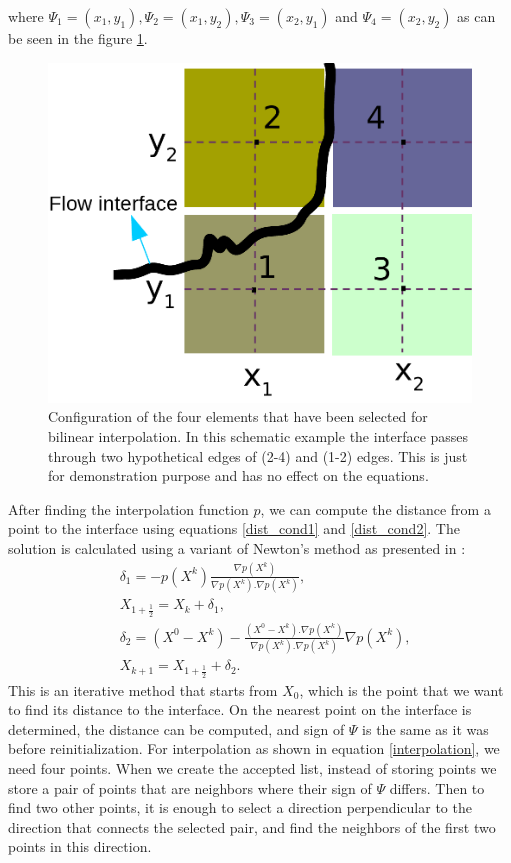 \documentclass[letterpaper,10pt]{article}
\begin{document}
where $\varPsi_1=(x_1,y_1), \varPsi_2=(x_1,y_2), \varPsi_3=(x_2,y_1)$ and $\varPsi_4=(x_2,y_2)$ as can be seen in the figure \ref{fig:bilinear_interp}.
\begin{figure}[ht]
\centering
\includegraphics[scale=.15]{IMAGES/bilinear_interp.png}
\caption{Configuration of the four elements that have been selected for bilinear interpolation. In this schematic example the interface passes through two hypothetical edges of (2-4) and (1-2) edges. This is just for demonstration purpose and has no effect on the equations.}
                \label{fig:bilinear_interp}
\end{figure}
After finding the interpolation function $p$, we can compute the distance from a point to the interface using equations \eqref{dist_cond1} and \eqref{dist_cond2}. 
The solution is calculated using a variant of Newton's method as presented in \cite{Chopp2001}:
\begin{subequations}
\label{eqnewton}
\begin{align}
&\delta_1=-p(X^k)\frac{\nabla p(X^k)}{\nabla p(X^k).\nabla p(X^k)},\\
& X_{1+\frac{1}{2}}=X_k+\delta_1,\\
& \delta_2=(X^0-X^k)-\frac{(X^0-X^k).\nabla p(X^k)}{\nabla p(X^k).\nabla p(X^k)}\nabla p(X^k),\\
&X_{k+1}=X_{1+\frac{1}{2}}+\delta_2.
\end{align}
\end{subequations}
This is an iterative method that starts from $X_0$, which is the point that we want to find its distance to the interface. 
On the nearest point on the interface is determined, the distance can be computed, and sign of $\varPsi$ is the same as it was before reinitialization.
For interpolation as shown in equation \eqref{interpolation}, we need four points. When we create the accepted list, instead of storing points we store a pair of points that are 
neighbors where their sign of $\varPsi$ differs. Then to find two other points, it is enough to select a direction perpendicular to the direction that connects the selected pair, 
and find the neighbors of the first two points in this direction. 
\end{document}
